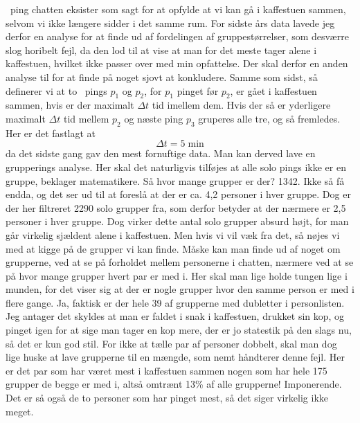 \begin{article}
\coffee\ ping chatten eksister som sagt for at opfylde at vi kan gå i kaffestuen sammen, selvom vi ikke længere sidder i det samme rum. For sidste års data lavede jeg derfor en analyse for at finde ud af fordelingen af gruppestørrelser, som desværre slog horibelt fejl, da den lod til at vise at man for det meste tager alene i kaffestuen, hvilket ikke passer over med min opfattelse.
Der skal derfor en anden analyse til for at finde på noget sjovt at konkludere. Samme som sidst, så definerer vi at to \coffee\ pings $p_1$ og $p_2$, for $p_1$ pinget før $p_2$, er gået i kaffestuen sammen, hvis er der maximalt $\Delta t$ tid imellem dem. Hvis der så er yderligere maximalt $\Delta t$ tid mellem $p_2$ og næste ping $p_3$ gruperes alle tre, og så fremledes. Her er det fastlagt at
\[ \Delta t = 5 \; \text{min} \]
da det sidste gang gav den mest fornuftige data. Man kan derved lave en grupperings analyse. Her skal det naturligvis tilføjes at alle solo pings ikke er en gruppe, beklager matematikere. 
Så hvor mange grupper er der? 1342. Ikke så få endda, og det ser ud til at foreslå at der er ca. 4,2 personer i hver gruppe. Dog er der her filtreret 2290 solo grupper fra, som derfor betyder at der nærmere er 2,5 personer i hver gruppe. Dog virker dette antal solo grupper absurd højt, for man går virkelig sjældent alene i kaffestuen. Men hvis vi vil væk fra det, så nøjes vi med at kigge på de grupper vi kan finde.
Måske kan man finde ud af noget om grupperne, ved at se på forholdet mellem personerne i chatten, nærmere ved at se på hvor mange grupper hvert par er med i. Her skal man lige holde tungen lige i munden, for det viser sig at der er nogle grupper hvor den samme person er med i flere gange. Ja, faktisk er der hele 39 af grupperne med dubletter i personlisten. Jeg antager det skyldes at man er faldet i snak i kaffestuen, drukket sin kop, og pinget igen for at sige man tager en kop mere, der er jo statestik på den slags nu, så det er kun god stil. For ikke at tælle par af personer dobbelt, skal man dog lige huske at lave grupperne til en mængde, som nemt håndterer denne fejl.
Her er det par som har været mest i kaffestuen sammen nogen som har hele 175 grupper de begge er med i, altså omtrænt 13\% af alle grupperne! Imponerende. Det er så også de to personer som har pinget mest, så det siger virkelig ikke meget.


\end{article}
